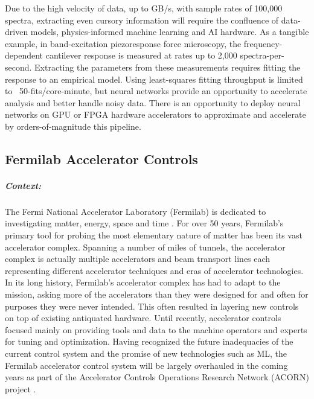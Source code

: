 Due to the high velocity of data, up to GB/s, with sample rates of 100,000 spectra, extracting even cursory information will require the confluence of data-driven models, physics-informed machine learning and AI hardware. As a tangible example, in band-excitation piezoresponse force microscopy, the frequency-dependent cantilever response is measured at rates up to 2,000 spectra-per-second. Extracting the parameters from these measurements requires fitting the response to an empirical model. Using least-squares fitting throughput is limited to ~50-fits/core-minute, but neural networks provide an opportunity to accelerate analysis and better handle noisy data\cite{Borodinov2019-pn}. There is an opportunity to deploy neural networks on GPU or FPGA hardware accelerators to approximate and accelerate by orders-of-magnitude this pipeline.
  
 

\subsection{Fermilab Accelerator Controls}

\subparagraph*{Context:} 
            The Fermi National Accelerator Laboratory (Fermilab) is dedicated to investigating matter, energy, space and time \cite{fermilab_about}. For over 50 years, Fermilab's primary tool for probing the most elementary nature of matter has been its vast accelerator complex. Spanning a number of miles of tunnels, the accelerator complex is actually multiple accelerators and beam transport lines each representing different accelerator techniques and eras of accelerator technologies. In its long history, Fermilab's accelerator complex has had to adapt to the mission, asking more of the accelerators than they were designed for and often for purposes they were never intended. This often resulted in layering new controls on top of existing antiquated hardware. Until recently, accelerator controls focused mainly on providing tools and data to the machine operators and experts for tuning and optimization. Having recognized the future inadequacies of the current control system and the promise of new technologies such as ML, the Fermilab accelerator control system will be largely overhauled in the coming years as part of the Accelerator Controls Operations Research Network (ACORN) project \cite{acorn_paper}. 
            
